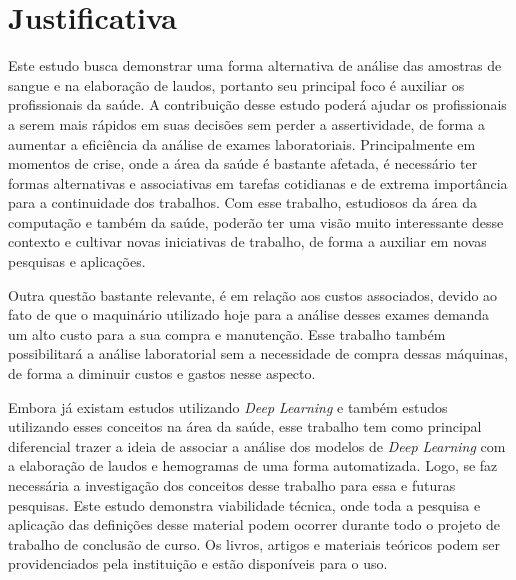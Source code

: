 

\section{Justificativa}
\label{sec:justificativa}
Este estudo busca demonstrar uma forma alternativa de análise das amostras de sangue e na elaboração de laudos, portanto seu principal foco é auxiliar os profissionais da saúde. A contribuição desse estudo poderá ajudar os profissionais a serem mais rápidos em suas decisões sem perder a assertividade, de forma a aumentar a eficiência da análise de exames laboratoriais. Principalmente em momentos de crise, onde a área da saúde é bastante afetada, é necessário ter formas alternativas e associativas em tarefas cotidianas e de extrema importância para a continuidade dos trabalhos. Com esse trabalho, estudiosos da área da computação e também da saúde, poderão ter uma visão muito interessante desse contexto e cultivar novas iniciativas de trabalho, de forma a auxiliar em novas pesquisas e aplicações.

Outra questão bastante relevante, é em relação aos custos associados, devido ao fato de que o maquinário utilizado hoje para a análise desses exames demanda um alto custo para a sua compra e manutenção. Esse trabalho também possibilitará a análise laboratorial sem a necessidade de compra dessas máquinas, de forma a diminuir custos e gastos nesse aspecto.

Embora já existam estudos utilizando \emph{Deep Learning} e também estudos utilizando esses conceitos na área da saúde, esse trabalho tem como principal diferencial trazer a ideia de associar a análise dos modelos de \emph{Deep Learning} com a elaboração de laudos e hemogramas de uma forma automatizada. Logo, se faz necessária a investigação dos conceitos desse trabalho para essa e futuras pesquisas. Este estudo demonstra viabilidade técnica, onde toda a pesquisa e aplicação das definições desse material podem ocorrer durante todo o projeto de trabalho de conclusão de curso. Os livros, artigos e materiais teóricos podem ser providenciados pela instituição e estão disponíveis para o uso.


